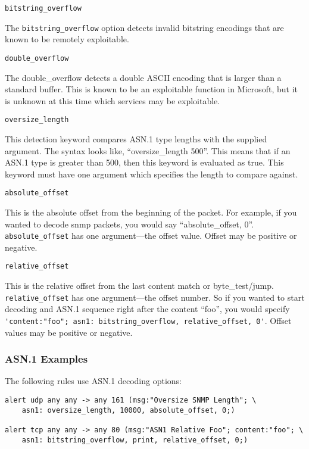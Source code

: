 \documentclass[english]{report}
\newcounter{slistnum}
\newenvironment{slist}
{ \begin{list}{ {\bf \arabic{slistnum}.} }{\usecounter{slistnum} } }
{ \end{list} }
\begin{document}
\begin{slist}

\item \texttt{bitstring\_overflow}


The \texttt{bitstring\_overflow} option detects invalid bitstring encodings that are known to be
remotely exploitable.

\item \texttt{double\_overflow}


The double\_overflow detects a double ASCII encoding that is larger than a
standard buffer.  This is known to be an exploitable function in Microsoft, but
it is unknown at this time which services may be exploitable.

\item \texttt{oversize\_length}


This detection keyword compares ASN.1 type lengths with the supplied argument.
The syntax looks like, ``oversize\_length 500''.  This means that if an ASN.1
type is greater than 500, then this keyword is evaluated as true.  This
keyword must have one argument which specifies the length to compare against.

\item \texttt{absolute\_offset}


This is the absolute offset from the beginning of the packet.  For example, if
you wanted to decode snmp packets, you would say ``absolute\_offset, 0''.  
\texttt{absolute\_offset} has one argument---the offset value.  Offset may be
positive or negative.

\item \texttt{relative\_offset}


This is the relative offset from the last content match or byte\_test/jump. 
\texttt{relative\_offset} has one argument---the offset number.  So if you 
wanted to start decoding and ASN.1 sequence right after the content ``foo'', 
you would specify \verb!'content:"foo"; asn1: bitstring_overflow, relative_offset, 0'!.  Offset values may be positive or negative.

\end{slist}

\subsubsection{ASN.1 Examples}

The following rules use ASN.1 decoding options:

\begin{verbatim}
alert udp any any -> any 161 (msg:"Oversize SNMP Length"; \
    asn1: oversize_length, 10000, absolute_offset, 0;)
    
alert tcp any any -> any 80 (msg:"ASN1 Relative Foo"; content:"foo"; \
    asn1: bitstring_overflow, print, relative_offset, 0;)
\end{verbatim}
\end{document}
